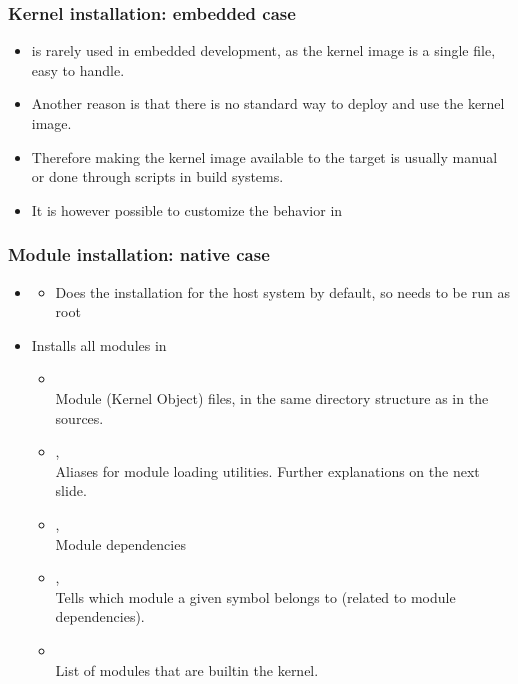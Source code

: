 \begin{frame}
  \frametitle{Kernel installation: embedded case}
  \begin{itemize}
  \item {} is rarely used in embedded development, as the
    kernel image is a single file, easy to handle.
  \item Another reason is that there is no standard way to deploy and
    use the kernel image.
  \item Therefore making the kernel image available to the target is
    usually manual or done through scripts in build systems.
  \item It is however possible to customize the 
    behavior in 
  \end{itemize}
\end{frame}

\begin{frame}
  \frametitle{Module installation: native case}
  \begin{itemize}
  \item {}
    \begin{itemize}
    \item Does the installation for the host system by default, so
      needs to be run as root
    \end{itemize}
  \item Installs all modules in 
    \begin{itemize}
    \item {}\\
      Module  (Kernel Object) files, in the same directory
      structure as in the sources.
    \item {}, \\
      Aliases for module loading utilities. Further explanations
      on the next slide.
    \item {}, \\
      Module dependencies
    \item {}, \\
      Tells which module a given symbol belongs to (related to
      module dependencies).
    \item {}\\
      List of modules that are builtin the kernel.
    \end{itemize}
  \end{itemize}
\end{frame}

